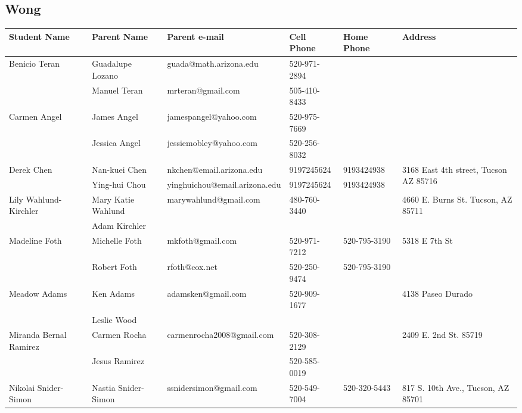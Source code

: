 \documentclass[landscape]{article}\usepackage[]{graphicx}\usepackage[]{color}
\begin{document}
\subsection{Wong}
\begin{longtable}{|p{100pt}|p{100pt}|p{140pt}|p{60pt}|p{64pt}|p{120pt}|}
\textbf{Student Name} & \textbf{Parent Name} & \textbf{Parent e-mail} & \textbf{Cell Phone} & \textbf{Home Phone} & \textbf{Address}\\
\hline
\hline
\multirow{2}{100pt}{Benicio Teran} & Guadalupe Lozano & guada@math.arizona.edu & 520-971-2894 &  & \multirow{2}{120pt}{} \\
 & Manuel Teran & mrteran@gmail.com & 505-410-8433 &  & \\
\hline
\multirow{2}{100pt}{Carmen Angel} & James Angel & jamespangel@yahoo.com & 520-975-7669 &  & \multirow{2}{120pt}{} \\
 & Jessica Angel & jessiemobley@yahoo.com & 520-256-8032 &  & \\
\hline
\multirow{2}{100pt}{Derek Chen} & Nan-kuei Chen & nkchen@email.arizona.edu & 9197245624 & 9193424938 & \multirow{2}{120pt}{3168 East 4th street, Tucson AZ 85716} \\
 & Ying-hui Chou & yinghuichou@email.arizona.edu & 9197245624 & 9193424938 & \\
\hline
\multirow{2}{100pt}{Lily Wahlund-Kirchler} & Mary Katie Wahlund & marywahlund@gmail.com & 480-760-3440 &  & \multirow{2}{120pt}{4660 E. Burns St. Tucson, AZ 85711} \\
 & Adam Kirchler &  &  &  & \\
\hline
\multirow{2}{100pt}{Madeline Foth} & Michelle Foth & mkfoth@gmail.com & 520-971-7212 & 520-795-3190 & \multirow{2}{120pt}{5318 E 7th St} \\
 & Robert Foth & rfoth@cox.net & 520-250-9474 & 520-795-3190 & \\
\hline
\multirow{2}{100pt}{Meadow Adams} & Ken Adams & adamsken@gmail.com & 520-909-1677 &  & \multirow{2}{120pt}{4138 Paseo Durado} \\
 & Leslie Wood &  &  &  & \\
\hline
\multirow{2}{100pt}{Miranda Bernal Ramirez} & Carmen Rocha & carmenrocha2008@gmail.com & 520-308-2129 &  & \multirow{2}{120pt}{2409 E. 2nd St. 85719} \\
 & Jesus Ramirez &  & 520-585-0019 &  & \\
\hline
\multirow{2}{100pt}{Nikolai Snider-Simon} & Nastia Snider-Simon & ssnidersimon@gmail.com & 520-549-7004 & 520-320-5443 & \multirow{2}{120pt}{817 S. 10th Ave., Tucson, AZ 85701} \\

\end{longtable}
\end{document}
